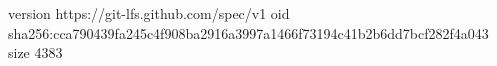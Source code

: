 version https://git-lfs.github.com/spec/v1
oid sha256:cca790439fa245c4f908ba2916a3997a1466f73194c41b2b6dd7bcf282f4a043
size 4383
